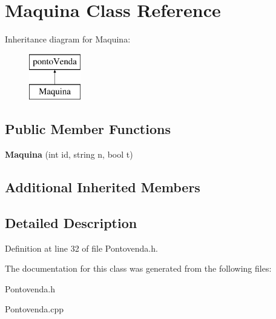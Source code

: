 \hypertarget{classMaquina}{}\section{Maquina Class Reference}
\label{classMaquina}
Inheritance diagram for Maquina\+:\begin{figure}[H]
\begin{center}
\leavevmode
\includegraphics[height=2.000000cm]{classMaquina}
\end{center}
\end{figure}
\subsection*{Public Member Functions}
\begin{DoxyCompactItemize}
\item 
\mbox{\label{classMaquina_ade4f601c362ab47f5671466b8d557659}} 
{\bfseries Maquina} (int id, string n, bool t)
\end{DoxyCompactItemize}
\subsection*{Additional Inherited Members}


\subsection{Detailed Description}


Definition at line 32 of file Pontovenda.\+h.



The documentation for this class was generated from the following files\+:\begin{DoxyCompactItemize}
\item 
Pontovenda.\+h\item 
Pontovenda.\+cpp\end{DoxyCompactItemize}
